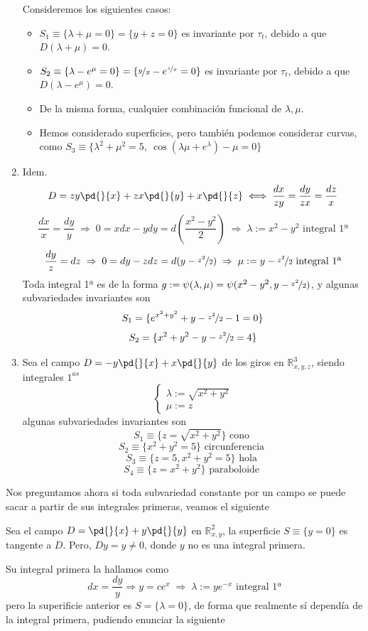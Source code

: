 \begin{eje}
\begin{enumerate}
            Consideremos los siguientes casos:
            \begin{itemize}
                \item $S_1  \equiv\{\lambda+\mu=0\}=\{y+z=0\}$ es invariante por $\tau_t$, debido a que $D(\lambda+\mu)=0$.
                \item $S_2  \equiv\{\lambda-e^{\mu}=0\}=\{\nicefrac{y}{x}-e^{\nicefrac{z}{x}}=0\}$ es invariante por $\tau_t$, debido a que $D(\lambda-e^{\mu})=0$.
                \item De la misma forma, cualquier combinación funcional de $\lambda, \mu$.
                \item Hemos considerado superficies, pero también podemos considerar curvas, como $S_3\equiv \{\lambda^2 +\mu^2=5, \: \cos(\lambda\mu+e^{\lambda})-\mu=0\}$
            \end{itemize}
            \item Idem. $$D=zy \pd{}{x}+zx\pd{}{y}+x \pd{}{z} \iff \dfrac{dx}{zy}=\dfrac{dy}{zx}=\dfrac{dz}{x} $$
            $$\dfrac{dx}{x}=\dfrac{dy}{y} \; \Rightarrow \; 0 = xdx-ydy = d\left( \dfrac{x^2-y^2}{2}\right)\; \Rightarrow \; \lambda:=x^2-y^2 \text{ integral 1ª}$$
            $$\dfrac{dy}{z}=dz \; \Rightarrow \; 0=dy-zdz=d(y-\nicefrac{z^2}{2}) \; \Rightarrow \; \mu:= y - \nicefrac{z^2}{2} \text{ integral 1ª}$$
            Toda integral 1ª es de la forma $g:= \psi(\lambda, \mu)=\psi(x^2-y^2, y - \nicefrac{z^2}{2})$, y algunas subvariedades invariantes son
            $$S_1=\{e^{x^2+y^2}+y-\nicefrac{z^2}{2}-1=0\}$$
            $$S_2=\{{x^2+y^2}-y-\nicefrac{z^2}{2}=4\}$$
            \item Sea el campo $D=-y\pd{}{x}+x\pd{}{y}$ de los giros en $\mathbb R^3_{x,y,z}$, siendo integrales $1^{as}$
            $$\left\{ \begin{array}{cc}
                \lambda:=\sqrt{x^2+y^2}\\ \mu:=z
            \end{array} \right. $$
            algunas subvariedades invariantes son 
            $$S_1\equiv \{z=\sqrt{x^2+y^2}\} \text{ cono }$$
            $$S_2\equiv \{x^2+y^2=5\} \text{ circunferencia }$$
            $$S_3\equiv \{z=5, x^2+y^2=5\} \text{ hola }$$
            $$S_4 \equiv \{z=x^2+y^2\} \text{ paraboloide }$$
        \end{enumerate}
    \end{eje}
    Nos preguntamos ahora si toda subvariedad constante por un campo se puede sacar a partir de sus integrales primeras, veamos el siguiente
    \begin{eje}
        Sea el campo $D=\pd{}{x}+y\pd{}{y}$ en $\mathbb R^2_{x,y}$, la superficie $S\equiv\{y=0\}$ es tangente a $D$. Pero, $Dy=y \neq 0$, donde $y$ no es una integral primera.

        Su integral primera la hallamos como
        $$dx=\dfrac{dy}{y} \Rightarrow y=ce^x \; \Rightarrow \; \lambda:=ye^{-x} \text{ integral 1ª}$$
        pero la superificie anterior es $S=\{\lambda=0\}$, de forma que realmente sí dependía de la integral primera, pudiendo enunciar la siguiente
    \end{eje}

